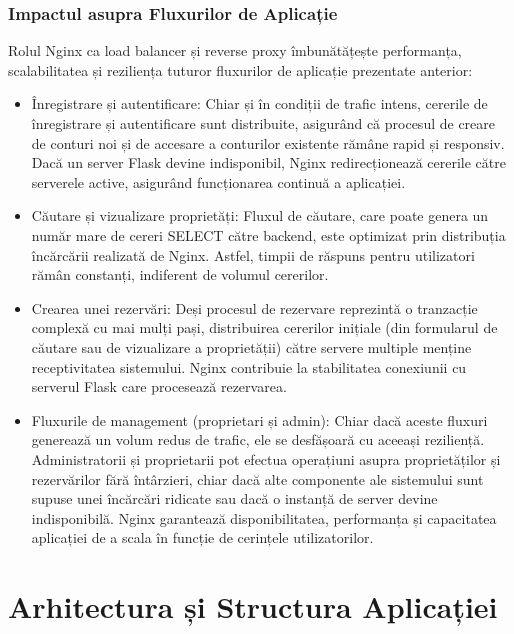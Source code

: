 \documentclass[12pt, a4paper, oneside, romanian]{teza-upb}
\begin{document}
\subsection*{Impactul asupra Fluxurilor de Aplicație}
Rolul Nginx ca load balancer și reverse proxy îmbunătățește performanța, scalabilitatea și reziliența tuturor fluxurilor de aplicație prezentate anterior:
\begin{itemize}
	\item Înregistrare și autentificare: Chiar și în condiții de trafic intens, cererile de înregistrare și autentificare sunt distribuite, asigurând că procesul de creare de conturi noi și de accesare a conturilor existente rămâne rapid și responsiv. Dacă un server Flask devine indisponibil, Nginx redirecționează cererile către serverele active, asigurând funcționarea continuă a aplicației.
	
	\item Căutare și vizualizare proprietăți: Fluxul de căutare, care poate genera un număr mare de cereri SELECT către backend, este optimizat prin distribuția încărcării realizată de Nginx. Astfel, timpii de răspuns pentru utilizatori rămân constanți, indiferent de volumul cererilor.
	
	\item Crearea unei rezervări: Deși procesul de rezervare reprezintă o tranzacție complexă cu mai mulți pași, distribuirea cererilor inițiale (din formularul de căutare sau de vizualizare a proprietății) către servere multiple menține receptivitatea sistemului. Nginx contribuie la stabilitatea conexiunii cu serverul Flask care procesează rezervarea.

	\item Fluxurile de management (proprietari și admin): Chiar dacă aceste fluxuri generează un volum redus de trafic, ele se desfășoară cu aceeași reziliență. Administratorii și proprietarii pot efectua operațiuni asupra proprietăților și rezervărilor fără întârzieri, chiar dacă alte componente ale sistemului sunt supuse unei încărcări ridicate sau dacă o instanță de server devine indisponibilă. Nginx garantează disponibilitatea, performanța și capacitatea aplicației de a scala în funcție de cerințele utilizatorilor.
	
\end{itemize}


\chapter{Arhitectura și Structura Aplicației}
\end{document}
